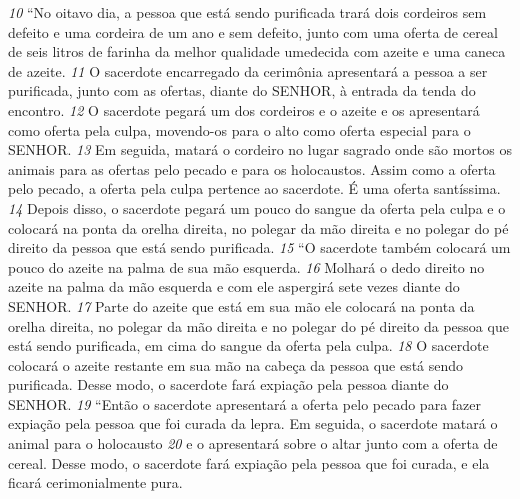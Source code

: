 \smallskip
\textit{\tiny 10}
“No oitavo dia, a pessoa que está sendo purificada trará dois cordeiros sem
defeito e uma cordeira de um ano e sem defeito, junto com uma oferta de cereal
de seis litros
 de farinha da melhor qualidade umedecida com azeite e uma
caneca
 de azeite. 
\textit{\tiny 11}
O sacerdote encarregado da cerimônia apresentará a pessoa
a ser purificada, junto com as ofertas, diante do SENHOR, à entrada da tenda do
encontro. 
\textit{\tiny 12}
O sacerdote pegará um dos cordeiros e o azeite e os apresentará
como oferta pela culpa, movendo-os para o alto como oferta especial para o
SENHOR. 
\textit{\tiny 13}
Em seguida, matará o cordeiro no lugar sagrado onde são mortos os
animais para as ofertas pelo pecado e para os holocaustos. Assim como a oferta
pelo pecado, a oferta pela culpa pertence ao sacerdote. É uma oferta santíssima.
\textit{\tiny 14}
Depois disso, o sacerdote pegará um pouco do sangue da oferta pela culpa e o
colocará na ponta da orelha direita, no polegar da mão direita e no polegar do pé
direito da pessoa que está sendo purificada.
\textit{\tiny 15}
“O   sacerdote também colocará um pouco do azeite na palma de sua mão
esquerda. 
\textit{\tiny 16}
Molhará o dedo direito no azeite na palma da mão esquerda e com
ele aspergirá sete vezes diante do SENHOR. 
\textit{\tiny 17}
Parte do azeite que está em sua mão
ele colocará na ponta da orelha direita, no polegar da mão direita e no polegar do
pé direito da pessoa que está sendo purificada, em cima do sangue da oferta pela
culpa. 
\textit{\tiny 18}
O sacerdote colocará o azeite restante em sua mão na cabeça da pessoa
que está sendo purificada. Desse modo, o sacerdote fará expiação pela pessoa
diante do SENHOR.
\textit{\tiny 19}
“Então o sacerdote apresentará a oferta pelo pecado para fazer expiação pela
pessoa que foi curada da lepra. Em seguida, o sacerdote matará o animal para o
holocausto 
\textit{\tiny 20}
e o apresentará sobre o altar junto com a oferta de cereal. Desse
modo, o sacerdote fará expiação pela pessoa que foi curada, e ela ficará
cerimonialmente pura.

